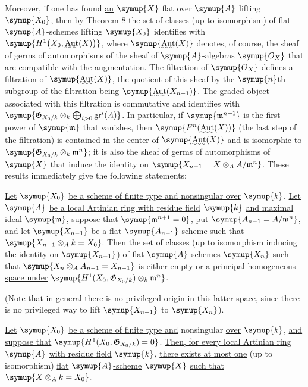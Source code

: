 Moreover, if one has found \uline{an} $\symup{X}$ flat over $\symup{A}$ lifting $\symup{X_0}$, then by Theorem
8 the set of classes (up to isomorphism) of flat $\symup{A}$-schemes lifting $\symup{X_0}$
identifies with
$\symup{H^1\bigl(X_0,\mathop{\text{\uwave{Aut}}}\nolimits(X)\bigr)}$,
where $\symup{\mathop{\text{\uwave{Aut}}}\nolimits(X)}$ denotes, of course, the sheaf of
germs of automorphisms of the sheaf of $\symup{A}$-algebras $\symup{O_X}$ that are
\uline{compatible with the augmentation}. The filtration of $\symup{O_X}$ defines a
filtration of $\symup{\mathop{\text{\uwave{Aut}}}\nolimits(X)}$, the quotient of this sheaf
by the $\symup{n}$th subgroup of the filtration being
$\symup{\mathop{\text{\uwave{Aut}}}\nolimits(X_{n-1})}$. The graded object associated with this
filtration is commutative and identifies with
$\symup{\mathfrak G_{X_0/k}\otimes_k\bigoplus_{i>0}\operatorname{gr}^i(A)}$. In particular, if
$\symup{\mathfrak m^{n+1}}$ is the first power of $\symup{\mathfrak m}$ that vanishes, then
$\symup{F^n(\mathop{\text{\uwave{Aut}}}\nolimits(X))}$ (the last step of the filtration) is
contained in the center of $\symup{\mathop{\text{\uwave{Aut}}}\nolimits(X)}$ and is
isomorphic to $\symup{\mathfrak G_{X_0/k}\otimes_k\mathfrak m^n}$; it is also the sheaf of
germs of automorphisms of $\symup{X}$ that induce the identity on
$\symup{X_{n-1}=X\otimes_A A/\mathfrak m^n}$. These results immediately give the
following statements:


 \uline{Let} $\symup{X_0}$ \uline{be a scheme of finite type and nonsingular
over} $\symup{k}$. \uline{Let} $\symup{A}$ \uline{be a local Artinian ring with residue field} $\symup{k}$ \uline{and maximal
ideal} $\symup{\mathfrak m}$, \uline{suppose that} $\symup{\mathfrak m^{n+1}=0}$, \uline{put}
$\symup{A_{n-1}=A/\mathfrak m^n}$, \uline{and let} $\symup{X_{n-1}}$ \uline{be a flat} $\symup{A_{n-1}}$\uline{-scheme such
that} $\symup{X_{n-1}\otimes_A k=X_0}$. \uline{Then the set of classes (up to isomorphism
inducing the identity on} $\symup{X_{n-1}}$) \uline{of flat} $\symup{A}$\uline{-schemes} $\symup{X_n}$ \uline{such that}
$\symup{X_n\otimes_A A_{n-1}=X_{n-1}}$ \uline{is either empty or a principal homogeneous
space under}
$\symup{H^1(X_0,\mathfrak G_{X_0/k})\otimes_k\mathfrak m^n}$.

(Note that in general there is no privileged origin in this latter space,
since there is no privileged way to lift $\symup{X_{n-1}}$ to $\symup{X_n}$).

 \uline{Let} $\symup{X_0}$ \uline{be a scheme of finite type and} nonsingular
\uline{over} $\symup{k}$, \uline{and suppose that} $\symup{H^1(X_0,\mathfrak G_{X_0/k})=0}$. \uline{Then, for every local
Artinian ring} $\symup{A}$ \uline{with residue field} $\symup{k}$, \uline{there exists at most one} (up to
isomorphism) \uline{flat} $\symup{A}$\uline{-scheme} $\symup{X}$ \uline{such that} $\symup{X\otimes_A k=X_0}$.

